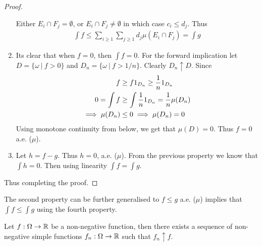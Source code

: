 \begin{proof}
\begin{enumerate}
    Either $E_i\cap F_j = \emptyset$, or $E_i\cap F_j\neq \emptyset$ in which case $c_i \leq d_j$. Thus 
    \begin{align*}
      \int f \leq \sum_{i\geq 1}\sum_{j\geq 1} d_j \mu(E_i\cap F_j) = \int g
    \end{align*}
  \item Its clear that when $f = 0$, then $\int f = 0$. For the forward implication let $D = \{\omega\ |\ f> 0\}$ and $D_n = \{\omega\ |\ f> 1/n\}$. Clearly $D_n \uparrow D$. Since
    \begin{align*}
      f &\geq f 1_{D_n} \geq \frac{1}{n} 1_{D_n} \\
      0 = \int f &\geq \int \frac{1}{n} 1_{D_n} = \frac{1}{n} \mu(D_n)\\
      \implies \mu(D_n) &\leq 0\implies \mu(D_n) = 0
    \end{align*}
    Using monotone continuity from below, we get that $\mu(D) = 0$. Thus $f=0$ a.e. ($\mu$). 
  \item Let $h = f -g$. Thus $h = 0$, a.e. ($\mu$). From the previous property we know that $\int h = 0$. Then using linearity $\int f = \int g$.
  \end{enumerate}
  Thus completing the proof.
\end{proof}
\begin{remark}
  The second property can be further generalised to $f \leq g$ a.e. ($\mu$) implies that $\int f \leq \int g$ using the fourth property.
\end{remark}
\begin{lemma}
  Let $f:\Omega \to \mathbb{R}$ be a non-negative function, then there exists a sequence of non-negative simple functions $f_n:\Omega\to\mathbb{R}$ such that $f_n \uparrow f$.
\end{lemma}
